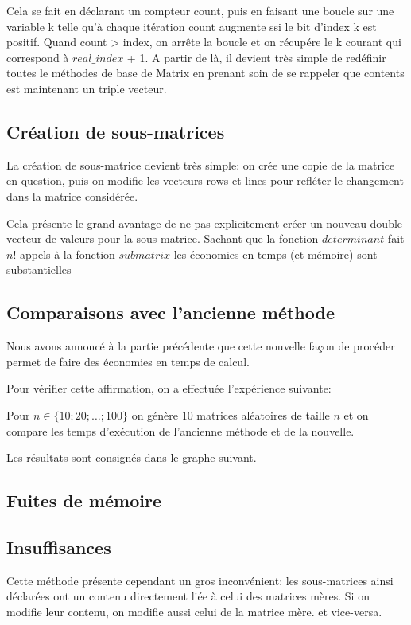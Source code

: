 \documentclass[a4paper,11pt]{article}
\begin{document}
Cela se fait en déclarant un compteur count, puis en faisant une boucle sur une variable k telle qu'à chaque itération count augmente ssi le bit d'index k est positif. Quand count > index, on arrête la boucle
et on récupére le k courant qui correspond à $real\_index$ + 1. 
A partir de là, il devient très simple de redéfinir toutes le méthodes de base de Matrix en prenant soin de se rappeler que contents est maintenant un triple vecteur.

\subsection{Création de sous-matrices}

La création de sous-matrice devient très simple: on crée une copie de la matrice en question, puis on modifie les vecteurs rows et lines pour refléter le changement dans la matrice considérée.

Cela présente le grand avantage de ne pas explicitement créer un nouveau double vecteur de valeurs pour la sous-matrice. Sachant que la fonction $determinant$ fait $n$! appels à la fonction $submatrix$ les économies en temps (et mémoire) sont substantielles


\subsection{Comparaisons avec l'ancienne méthode}

Nous avons annoncé à la partie précédente que cette nouvelle façon de procéder permet de faire des économies en temps de calcul.

Pour vérifier cette affirmation, on a effectuée l'expérience suivante:

Pour $n \in \{10;20;\dots;100\}$ on génère 10 matrices aléatoires de taille $n$ et on compare les temps d'exécution de l'ancienne méthode et de la nouvelle.

Les résultats sont consignés dans le graphe suivant.

\subsection{Fuites de mémoire}


\subsection{Insuffisances}

Cette méthode présente cependant un gros inconvénient: les sous-matrices ainsi déclarées ont un contenu directement liée à celui des matrices mères. Si on modifie leur contenu, on modifie aussi celui de la matrice mère. et vice-versa.
\end{document}
